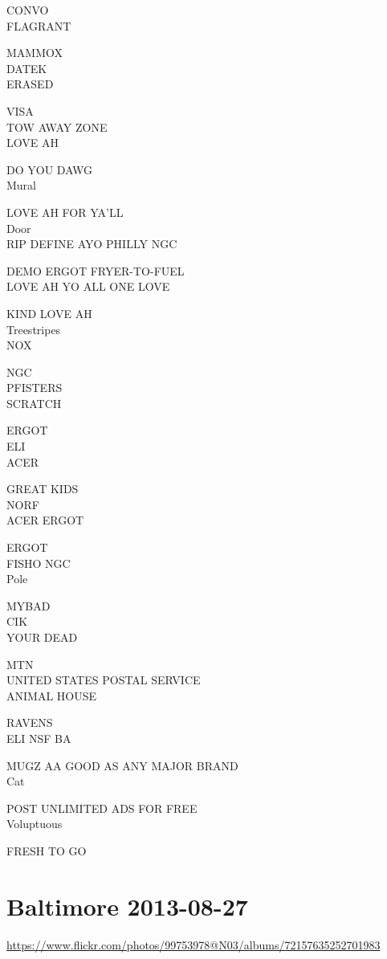 \documentclass[10pt,letterpaper]{article}
\begin{document}
CONVO\\
FLAGRANT

MAMMOX\\
DATEK\\
ERASED

VISA\\
TOW AWAY ZONE\\
LOVE AH

DO YOU DAWG\\
Mural

LOVE AH FOR YA'LL\\
Door\\
RIP DEFINE AYO PHILLY NGC

DEMO ERGOT FRYER{-}TO{-}FUEL\\
LOVE AH YO ALL ONE LOVE

KIND LOVE AH\\
Treestripes\\
NOX

NGC\\
PFISTERS\\
SCRATCH

ERGOT\\
ELI\\
ACER

GREAT KIDS\\
NORF\\
ACER ERGOT

ERGOT\\
FISHO NGC\\
Pole

MYBAD\\
CIK\\
YOUR DEAD

MTN\\
UNITED STATES POSTAL SERVICE\\
ANIMAL HOUSE

RAVENS\\
ELI NSF BA

MUGZ AA GOOD AS ANY MAJOR BRAND\\
Cat

POST UNLIMITED ADS FOR FREE\\
Voluptuous

FRESH TO GO


\section*{Baltimore 2013-08-27}

\url{https://www.flickr.com/photos/99753978@N03/albums/72157635252701983}
\end{document}
